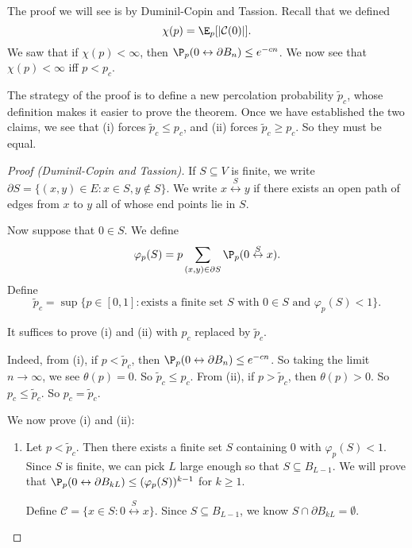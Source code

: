 \documentclass[a4paper]{article}
\begin{document}
The proof we will see is by Duminil-Copin and Tassion. Recall that we defined
\[
  \chi(p) = \E_p[|\mathcal{C}(0)|].
\]
We saw that if $\chi(p) < \infty$, then $\P_p(0 \leftrightarrow \partial B_n) \leq e^{-cn}$. We now see that $\chi(p) < \infty$ iff $p < p_c$.

The strategy of the proof is to define a new percolation probability $\tilde{p}_c$, whose definition makes it easier to prove the theorem. Once we have established the two claims, we see that (i) forces $\tilde{p}_c \leq p_c$, and (ii) forces $\tilde{p}_c \geq p_c$. So they must be equal.

\begin{proof}[Proof (Duminil-Copin and Tassion)]
  If $S \subseteq V$ is finite, we write $\partial S = \{(x, y) \in E: x \in S, y \not \in S\}$. We write $x \overset{S}{\leftrightarrow} y$ if there exists an open path of edges from $x$ to $y$ all of whose end points lie in $S$.

  Now suppose that $0 \in S$. We define
  \[
    \varphi_p(S) = p \sum_{(x, y) \in \partial S} \P_p(0 \overset{S}{\leftrightarrow} x).
  \]
  Define
  \[
    \tilde{p}_c = \sup \{p \in [0, 1]: \text{exists a finite set $S$ with $0 \in S$ and $\varphi_p(S) < 1$}\}.
  \]
  \begin{claim}
    It suffices to prove (i) and (ii) with $p_c$ replaced by $\tilde{p}_c$.
  \end{claim}

  Indeed, from (i), if $p < \tilde{p}_c$, then $\P_p(0 \leftrightarrow \partial B_n) \leq e^{-cn}$. So taking the limit $n \to \infty$, we see $\theta(p) = 0$. So $\tilde{p}_c \leq p_c$. From (ii), if $p > \tilde{p}_c$, then $\theta(p) > 0$. So $p_c \leq \tilde{p}_c$. So $p_c = \tilde{p}_c$.

  We now prove (i) and (ii):
  \begin{enumerate}
    \item Let $p < \tilde{p}_c$. Then there exists a finite set $S$ containing $0$ with $\varphi_p(S) < 1$. Since $S$ is finite, we can pick $L$ large enough so that $S \subseteq B_{L - 1}$. We will prove that $\P_p(0 \leftrightarrow \partial B_{kL}) \leq (\varphi_p(S))^{k - 1}$ for $k \geq 1$.

      Define $\mathcal{C} = \{x \in S: 0 \overset{S}{\leftrightarrow} x\}$. Since $S \subseteq B_{L - 1}$, we know $S \cap \partial B_{kL} = \emptyset$.


\end{enumerate}
\end{proof}
\end{document}
